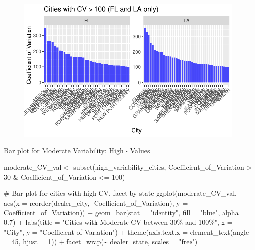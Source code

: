 \documentclass[
  letterpaper,
  DIV=11,
  numbers=noendperiod]{scrartcl}
\newenvironment{Shaded}{\begin{snugshade}}{\end{snugshade}}
\newcommand{\AttributeTok}[1]{\textcolor[rgb]{0.40,0.45,0.13}{#1}}
\newcommand{\CommentTok}[1]{\textcolor[rgb]{0.37,0.37,0.37}{#1}}
\newcommand{\DecValTok}[1]{\textcolor[rgb]{0.68,0.00,0.00}{#1}}
\newcommand{\FloatTok}[1]{\textcolor[rgb]{0.68,0.00,0.00}{#1}}
\newcommand{\FunctionTok}[1]{\textcolor[rgb]{0.28,0.35,0.67}{#1}}
\newcommand{\NormalTok}[1]{\textcolor[rgb]{0.00,0.23,0.31}{#1}}
\newcommand{\OtherTok}[1]{\textcolor[rgb]{0.00,0.23,0.31}{#1}}
\newcommand{\SpecialCharTok}[1]{\textcolor[rgb]{0.37,0.37,0.37}{#1}}
\newcommand{\StringTok}[1]{\textcolor[rgb]{0.13,0.47,0.30}{#1}}
\begin{document}
\begin{figure}[H]

{\centering \includegraphics{CV_Communities2_files/figure-pdf/unnamed-chunk-10-1.pdf}

}

\end{figure}

Bar plot for Moderate Variability: High - Values

\begin{Shaded}
\begin{Highlighting}[]
\NormalTok{moderate\_CV\_val }\OtherTok{\textless{}{-}} \FunctionTok{subset}\NormalTok{(high\_variability\_cities, Coefficient\_of\_Variation }\SpecialCharTok{\textgreater{}} \DecValTok{30} \SpecialCharTok{\&}\NormalTok{ Coefficient\_of\_Variation }\SpecialCharTok{\textless{}=} \DecValTok{100}\NormalTok{)}

\CommentTok{\# Bar plot for cities with high CV, facet by state}
\FunctionTok{ggplot}\NormalTok{(moderate\_CV\_val, }\FunctionTok{aes}\NormalTok{(}\AttributeTok{x =} \FunctionTok{reorder}\NormalTok{(dealer\_city, }\SpecialCharTok{{-}}\NormalTok{Coefficient\_of\_Variation), }\AttributeTok{y =}\NormalTok{ Coefficient\_of\_Variation)) }\SpecialCharTok{+}
  \FunctionTok{geom\_bar}\NormalTok{(}\AttributeTok{stat =} \StringTok{"identity"}\NormalTok{, }\AttributeTok{fill =} \StringTok{"blue"}\NormalTok{, }\AttributeTok{alpha =} \FloatTok{0.7}\NormalTok{) }\SpecialCharTok{+}
  \FunctionTok{labs}\NormalTok{(}\AttributeTok{title =} \StringTok{"Cities with Moderate CV between 30\% and 100\%"}\NormalTok{, }\AttributeTok{x =} \StringTok{"City"}\NormalTok{, }\AttributeTok{y =} \StringTok{"Coefficient of Variation"}\NormalTok{) }\SpecialCharTok{+}
  \FunctionTok{theme}\NormalTok{(}\AttributeTok{axis.text.x =} \FunctionTok{element\_text}\NormalTok{(}\AttributeTok{angle =} \DecValTok{45}\NormalTok{, }\AttributeTok{hjust =} \DecValTok{1}\NormalTok{)) }\SpecialCharTok{+}
  \FunctionTok{facet\_wrap}\NormalTok{(}\SpecialCharTok{\textasciitilde{}}\NormalTok{ dealer\_state, }\AttributeTok{scales =} \StringTok{"free"}\NormalTok{)}
\end{Highlighting}
\end{Shaded}
\end{document}
